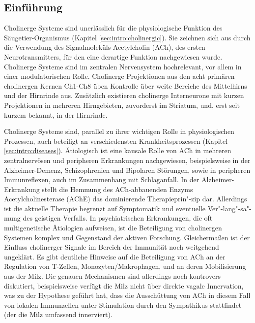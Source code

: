\subsection{Einführung}
Cholinerge Systeme sind unerlässlich für die physiologische Funktion des Säugetier-Organismus (Kapitel \ref{sec:intro:cholinergic}). Sie zeichnen sich aus durch die Verwendung des Signalmoleküls Acetylcholin (ACh), des ersten Neurotransmitters, für den eine derartige Funktion nachgewiesen wurde. Cholinerge Systeme sind im zentralen Nervensystem hochrelevant, vor allem in einer modulatorischen Rolle. Cholinerge Projektionen aus den acht primären cholinergen Kernen Ch1-Ch8 üben Kontrolle über weite Bereiche des Mittelhirns und der Hirnrinde aus. Zusätzlich existieren cholinerge Interneurone mit kurzen Projektionen in mehreren Hirngebieten, zuvorderst im Striatum, und, erst seit kurzem bekannt, in der Hirnrinde.

Cholinerge Systeme sind, parallel zu ihrer wichtigen Rolle in physiologischen Prozessen, auch beteiligt an verschiedensten Krankheitsprozessen (Kapitel \ref{sec:intro:diseases}). Ätiologisch ist eine kausale Rolle von ACh in mehreren zentralnervösen und peripheren Erkrankungen nachgewiesen, beispielsweise in der Alzheimer-Demenz, Schizophrenien und Bipolaren Störungen, sowie in peripheren Immunreflexen, auch im Zusammenhang mit Schlaganfall. In der Alzheimer-Erkrankung stellt die Hemmung des ACh-abbauenden Enzyms Acetylcholinesterase (AChE) das dominierende Therapieprin"-zip dar. Allerdings ist die aktuelle Therapie begrenzt auf Symptomatik und eventuelle Ver"-lang"-sa"-mung des geistigen Verfalls. In psychiatrischen Erkrankungen, die oft multigenetische Ätiologien aufweisen, ist die Beteiligung von cholinergen Systemen komplex und Gegenstand der aktiven Forschung. Gleichermaßen ist der Einfluss cholinerger Signale im Bereich der Immunität noch weitgehend ungeklärt. Es gibt deutliche Hinweise auf die Beteiligung von ACh an der Regulation von T-Zellen, Monozyten/Makrophagen, und an deren Mobilisierung aus der Milz. Die genauen Mechanismen sind allerdings noch kontrovers diskutiert, beispielsweise verfügt die Milz nicht über direkte vagale Innervation, was zu der Hypothese geführt hat, dass die Ausschüttung von ACh in diesem Fall von lokalen Immunzellen unter Stimulation durch den Sympathikus stattfindet (der die Milz umfassend innerviert).


